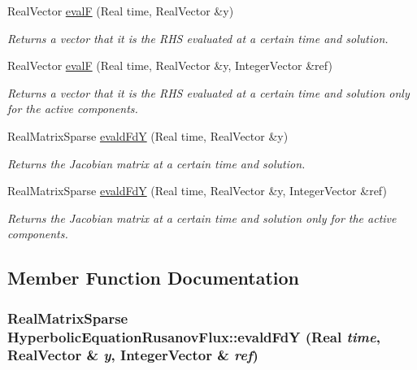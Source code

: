 \begin{DoxyCompactItemize}
\item 
RealVector \hyperlink{classHyperbolicEquationRusanovFlux_a32c91624ae05d626535a45b12776ef9b}{evalF} (Real time, RealVector \&y)
\begin{DoxyCompactList}\small\item\em Returns a vector that it is the RHS evaluated at a certain time and solution. \item\end{DoxyCompactList}\item 
RealVector \hyperlink{classHyperbolicEquationRusanovFlux_ad7ae556cb8b48064d77163d554d83396}{evalF} (Real time, RealVector \&y, IntegerVector \&ref)
\begin{DoxyCompactList}\small\item\em Returns a vector that it is the RHS evaluated at a certain time and solution only for the active components. \item\end{DoxyCompactList}\item 
RealMatrixSparse \hyperlink{classHyperbolicEquationRusanovFlux_a401392a4b37dd6ec8a15817f37936d1b}{evaldFdY} (Real time, RealVector \&y)
\begin{DoxyCompactList}\small\item\em Returns the Jacobian matrix at a certain time and solution. \item\end{DoxyCompactList}\item 
RealMatrixSparse \hyperlink{classHyperbolicEquationRusanovFlux_a5bdb9a2cdb9acfffb191c77db1dc10e8}{evaldFdY} (Real time, RealVector \&y, IntegerVector \&ref)
\begin{DoxyCompactList}\small\item\em Returns the Jacobian matrix at a certain time and solution only for the active components. \item\end{DoxyCompactList}\end{DoxyCompactItemize}


\subsection{Member Function Documentation}
\hypertarget{classHyperbolicEquationRusanovFlux_a5bdb9a2cdb9acfffb191c77db1dc10e8}{
\subsubsection[{evaldFdY}]{\setlength{\rightskip}{0pt plus 5cm}RealMatrixSparse HyperbolicEquationRusanovFlux::evaldFdY (Real {\em time}, \/  RealVector \& {\em y}, \/  IntegerVector \& {\em ref})}}
\label{classHyperbolicEquationRusanovFlux_a5bdb9a2cdb9acfffb191c77db1dc10e8}


